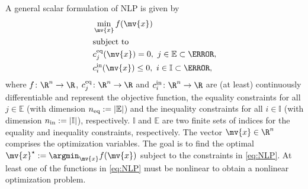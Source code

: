\documentclass[journal]{IEEEtranTIE}
\newcommand{\CHHA}[1]{{\color{red} [CH: #1]}} %
\begin{document}
A general scalar formulation of NLP is given by
\begin{subequations}\label{eq:NLP}
\begin{align}
&\mathop {\min }\limits_{\mv{x}} f(\mv{x})\\\nonumber
&{\rm{subject\ to}}\\
&c^{\rm eq}_j(\mv{x}) = 0,\ j \in \mathbb{E} \subset \N, \\
&c^{\rm in}_i(\mv{x}) \leq 0,\ i \in \mathbb{I} \subset \N,
\end{align}
\end{subequations}
%
%
where $f\colon \R^n \to \R$, $c^{\rm eq}_j\colon \R^n \to \R$ and $c^{\rm in}_i\colon \R^n \to \R$ are (at least) continuously differentiable and represent the objective function, the equality constraints for all  $j \in \mathbb{E}$ (with dimension $n_{\rm eq} := |\mathbb{E}|$) and the inequality constraints for all $i\in \mathbb{I}$ (with dimension $n_{\rm in} := |\mathbb{I}|$), respectively.  $\mathbb{I}$ and $\mathbb{E} $ are two finite sets of indices for the equality and inequality constraints, respectively. The vector $\mv{x} \in \R^n$ comprises  the optimization variables. The goal is to find the optimal $\mv{x}^\star := \argmin_{\mv{x}} f(\mv{x})$  subject to the constraints in \eqref{eq:NLP}. At least one of the functions in \eqref{eq:NLP} must be nonlinear to obtain a nonlinear optimization problem.
\end{document}

